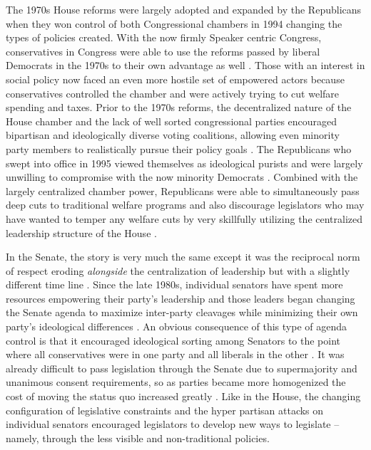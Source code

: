 \documentclass[12pt]{article}
\begin{document}
The 1970s House reforms were largely adopted and expanded by the Republicans when they won control of both Congressional chambers in 1994 changing the types of policies created. With the now firmly Speaker centric Congress, conservatives in Congress were able to use the reforms passed by liberal Democrats in the 1970s to their own advantage as well \citep{zelizer2007}. Those with an interest in social policy now faced an even more hostile set of empowered actors because conservatives controlled the chamber and were actively trying to cut welfare spending and taxes. Prior to the 1970s reforms, the decentralized nature of the House chamber and the lack of well sorted congressional parties encouraged bipartisan and ideologically diverse voting coalitions, allowing even minority party members to realistically pursue their policy goals \citep{poole1997}. The Republicans who swept into office in 1995 viewed themselves as ideological purists and were largely unwilling to compromise with the now minority Democrats \citep{hacker2006, theriault2013}. Combined with the largely centralized chamber power, Republicans were able to simultaneously pass deep cuts to traditional welfare programs and also discourage legislators who may have wanted to temper any welfare cuts by very skillfully utilizing the centralized leadership structure of the House \citep{aldrich2000}. 

In the Senate, the story is very much the same except it was the reciprocal norm of respect eroding \emph{alongside} the centralization of leadership but with a slightly different time line \citep{sinclair1986}. Since the late 1980s, individual senators have spent more resources empowering their party's leadership and those leaders began changing the Senate agenda to maximize inter-party cleavages while minimizing their own party's ideological differences \citep{lee2008}. An obvious consequence of this type of agenda control is that it encouraged ideological sorting among Senators to the point where all conservatives were in one party and all liberals in the other \citep{poole1997}. It was already difficult to pass legislation through the Senate due to supermajority and unanimous consent requirements, so as parties became more homogenized the cost of moving the status quo increased greatly \citep{koger2010}. Like in the House, the changing configuration of legislative constraints and the hyper partisan attacks on individual senators encouraged legislators to develop new ways to legislate -- namely, through the less visible and non-traditional policies.
\end{document}
